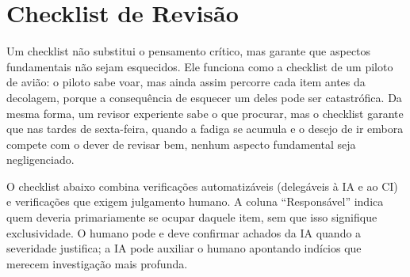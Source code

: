 \section{Checklist de Revisão}

Um checklist não substitui o pensamento crítico, mas garante que aspectos
fundamentais não sejam esquecidos. Ele funciona como a checklist de um piloto de
avião: o piloto sabe voar, mas ainda assim percorre cada item antes da decolagem,
porque a consequência de esquecer um deles pode ser catastrófica. Da mesma forma, um
revisor experiente sabe o que procurar, mas o checklist garante que nas tardes de
sexta-feira, quando a fadiga se acumula e o desejo de ir embora compete com o dever
de revisar bem, nenhum aspecto fundamental seja negligenciado.

O checklist abaixo combina verificações automatizáveis (delegáveis à IA e ao CI)
e verificações que exigem julgamento humano. A coluna ``Responsável'' indica quem
deveria primariamente se ocupar daquele item, sem que isso signifique exclusividade.
O humano pode e deve confirmar achados da IA quando a severidade justifica; a IA
pode auxiliar o humano apontando indícios que merecem investigação mais profunda.

